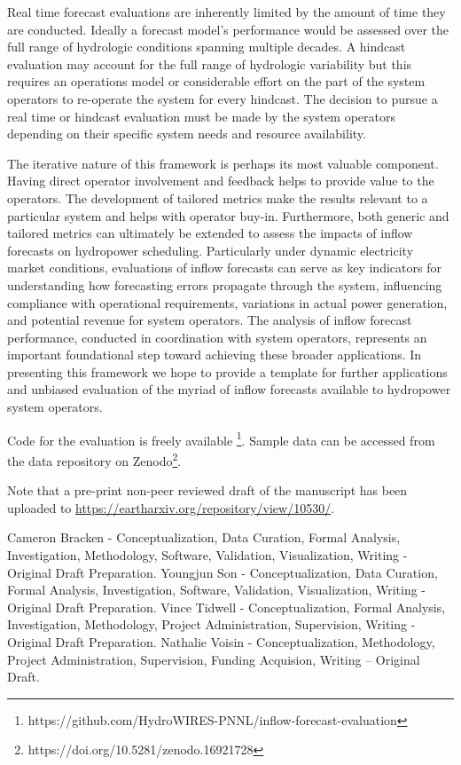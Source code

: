 \documentclass[MLA,Times1COL, hidelinks, doublespace]{WileyNJDv5} %
\begin{document}
Real time forecast evaluations are inherently limited by the amount of time they are conducted. Ideally a forecast model's performance would be assessed over the full range of hydrologic conditions spanning multiple decades. A hindcast evaluation may account for the full range of hydrologic variability but this requires an operations model or considerable effort on the part of the system operators to re-operate the system for every hindcast. The decision to pursue a real time or hindcast evaluation must be made by the system operators depending on their specific system needs and resource availability. 

The iterative nature of this framework is perhaps its most valuable component. Having direct operator involvement and feedback helps to provide value to the operators. The development of tailored metrics make the results relevant to a particular system and helps with operator buy-in. Furthermore, both generic and tailored metrics can ultimately be extended to assess the impacts of inflow forecasts on hydropower scheduling. Particularly under dynamic electricity market conditions, evaluations of inflow forecasts can serve as key indicators for understanding how forecasting errors propagate through the system, influencing compliance with operational requirements, variations in actual power generation, and potential revenue for system operators. The analysis of inflow forecast performance, conducted in coordination with system operators, represents an important foundational step toward achieving these broader applications. In presenting this framework we hope to provide a template for further applications and unbiased evaluation of the myriad of inflow forecasts available to hydropower system operators.



Code for the evaluation is freely available
\footnote{https://github.com/HydroWIRES-PNNL/inflow-forecast-evaluation}. Sample data can be accessed from the data repository on Zenodo\footnote{https://doi.org/10.5281/zenodo.16921728}. 

Note that a pre-print non-peer reviewed draft of the manuscript has been uploaded to \url{https://eartharxiv.org/repository/view/10530/}. 

{}

Cameron Bracken - Conceptualization, Data Curation, Formal Analysis, Investigation, Methodology, Software, Validation, Visualization, Writing - Original Draft Preparation. Youngjun Son - Conceptualization, Data Curation, Formal Analysis, Investigation, Software, Validation, Visualization, Writing - Original Draft Preparation. Vince Tidwell - Conceptualization, Formal Analysis, Investigation, Methodology, Project Administration, Supervision, Writing - Original Draft Preparation. Nathalie Voisin -  Conceptualization, Methodology, Project Administration, Supervision, Funding Acquision, Writing – Original Draft.
\end{document}

